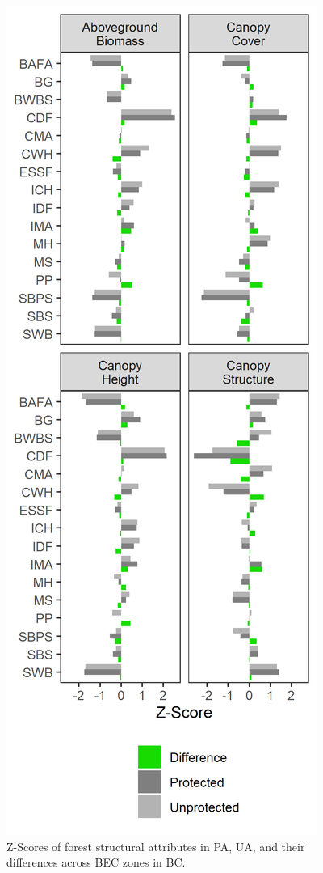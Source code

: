 \documentclass[11pt]{article}
\makeatletter
\def\maxwidth{\ifdim\Gin@nat@width>\linewidth\linewidth
\else\Gin@nat@width\fi}
\let\Oldincludegraphics\includegraphics
\renewcommand{\includegraphics}[1]{\Oldincludegraphics[width=\maxwidth]{#1}}
\makeatother
\begin{document}
\begin{figure}
\hypertarget{fig:structure-3d-scatter}{%
\centering
\includegraphics{figures/fstruct_zscores.png}
\caption{Z-Scores of forest structural attributes in PA, UA, and their
differences across BEC zones in BC.}\label{fig:structure-3d-scatter}
}
\end{figure}
\end{document}
